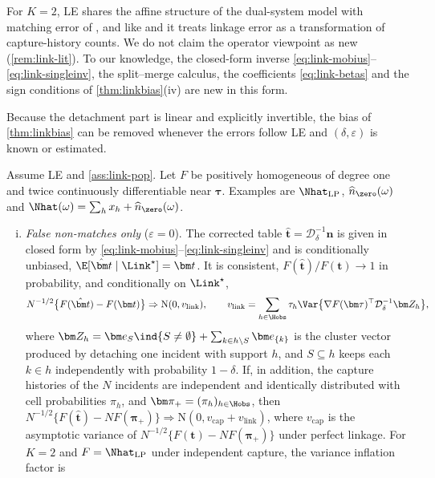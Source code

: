 For $K=2$, LE shares the affine structure of the dual-system model with matching error of \citet{ding1994}, and like \citet{ding1996} and \citet{diconsiglio2018} it treats linkage error as a transformation of capture-history counts. We do not claim the operator viewpoint as new (\cref{rem:link-lit}). To our knowledge, the closed-form inverse \eqref{eq:link-mobius}--\eqref{eq:link-singleinv}, the split--merge calculus, the coefficients \eqref{eq:link-betas} and the sign conditions of \cref{thm:linkbias}(iv) are new in this form.

Because the detachment part is linear and explicitly invertible, the bias of \cref{thm:linkbias} can be removed whenever the errors follow LE and $(\delta,\varepsilon)$ is known or estimated.

\begin{corollary}\label{cor:linkcorrect}
Assume LE and \cref{ass:link-pop}. Let $F$ be positively homogeneous of degree one and twice continuously differentiable near $\bm\tau$. Examples are $\Nhat_{\mathrm{LP}}$, $\widehat n_{\zero}(\omega)$ and $\Nhat(\omega)=\sum_hx_h+\widehat n_{\zero}(\omega)$.
\begin{enumerate}[(i)]
  \item \emph{False non-matches only} ($\varepsilon=0$). The corrected table $\hat{\bm t}=\mathcal D_\delta^{-1}\bm n$ is given in closed form by \eqref{eq:link-mobius}--\eqref{eq:link-singleinv} and is conditionally unbiased, $\E[\hat{\bm t}\mid\Link^\star]=\bm t$. It is consistent, $F(\hat{\bm t})/F(\bm t)\to1$ in probability, and conditionally on $\Link^\star$,
  \[
    N^{-1/2}\bigl\{F(\hat{\bm t})-F(\bm t)\bigr\}\Rightarrow\mathrm N(0,v_{\mathrm{link}}),\qquad
    v_{\mathrm{link}}=\sum_{h\in\Hobs}\tau_h\Var\bigl\{\nabla F(\bm\tau)^{\top}\mathcal D_\delta^{-1}\bm Z_h\bigr\},
  \]
  where $\bm Z_h=\bm e_{S}\ind{S\ne\emptyset}+\sum_{k\in h\setminus S}\bm e_{\{k\}}$ is the cluster vector produced by detaching one incident with support $h$, and $S\subseteq h$ keeps each $k\in h$ independently with probability $1-\delta$. If, in addition, the capture histories of the $N$ incidents are independent and identically distributed with cell probabilities $\pi_h$, and $\bm\pi_+=(\pi_h)_{h\in\Hobs}$, then $N^{-1/2}\{F(\hat{\bm t})-NF(\bm\pi_+)\}\Rightarrow\mathrm N(0,v_{\mathrm{cap}}+v_{\mathrm{link}})$, where $v_{\mathrm{cap}}$ is the asymptotic variance of $N^{-1/2}\{F(\bm t)-NF(\bm\pi_+)\}$ under perfect linkage. For $K=2$ and $F=\Nhat_{\mathrm{LP}}$ under independent capture, the variance inflation factor is

\end{enumerate}
\end{corollary}
